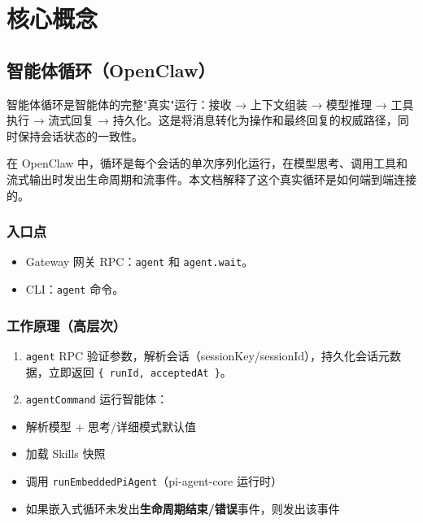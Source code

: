 \chapter{核心概念}

\section{智能体循环（OpenClaw）}


智能体循环是智能体的完整"真实"运行：接收 → 上下文组装 → 模型推理 → 工具执行 → 流式回复 → 持久化。这是将消息转化为操作和最终回复的权威路径，同时保持会话状态的一致性。

在 OpenClaw 中，循环是每个会话的单次序列化运行，在模型思考、调用工具和流式输出时发出生命周期和流事件。本文档解释了这个真实循环是如何端到端连接的。

\subsection{入口点}


\begin{itemize}
  \item Gateway 网关 RPC：\texttt{agent} 和 \texttt{agent.wait}。
  \item CLI：\texttt{agent} 命令。
\end{itemize}


\subsection{工作原理（高层次）}


\begin{enumerate}
  \item \texttt{agent} RPC 验证参数，解析会话（sessionKey/sessionId），持久化会话元数据，立即返回 \texttt{\{ runId, acceptedAt \}}。
  \item \texttt{agentCommand} 运行智能体：
\end{enumerate}

\begin{itemize}
  \item 解析模型 + 思考/详细模式默认值
  \item 加载 Skills 快照
  \item 调用 \texttt{runEmbeddedPiAgent}（pi-agent-core 运行时）
  \item 如果嵌入式循环未发出\textbf{生命周期结束/错误}事件，则发出该事件
\end{itemize}

